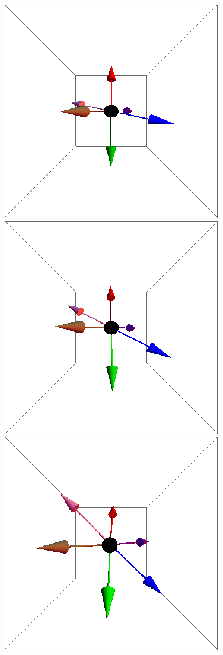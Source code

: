 \documentclass{article}
\begin{document}
\begin{figure}[ht]
\centering
\includegraphics[scale=0.22]{100/1S000to005G.png}
\includegraphics[scale=0.22]{100/39S000to005G.png}
\includegraphics[scale=0.22]{100/42S000to005G.png}

\end{figure}
\end{document}
